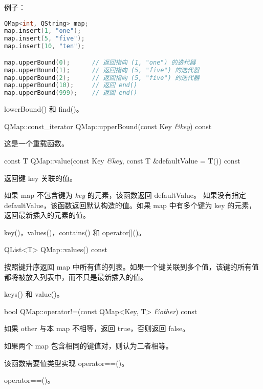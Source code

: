例子：

\begin{lstlisting}[language=C++]
QMap<int, QString> map;
map.insert(1, "one");
map.insert(5, "five");
map.insert(10, "ten");

map.upperBound(0);      // 返回指向 (1, "one") 的迭代器
map.upperBound(1);      // 返回指向 (5, "five") 的迭代器
map.upperBound(2);      // 返回指向 (5, "five") 的迭代器
map.upperBound(10);     // 返回 end()
map.upperBound(999);    // 返回 end()
\end{lstlisting}

\begin{seeAlso}
lowerBound() 和 find()。
\end{seeAlso}

QMap::const\_iterator QMap::upperBound(const Key \emph{\&key}) const

这是一个重载函数。

\splitLine

const T QMap::value(const Key \emph{\&key}, const T \&defaultValue = T()) const

返回键 key 关联的值。

如果 map 不包含键为 \emph{key} 的元素，该函数返回 defaultValue。 如果没有指定 defaultValue，该函数返回默认构造的值。如果 map 中有多个键为 key 的元素，返回最新插入的元素的值。

\begin{seeAlso}
key()，values()，contains() 和 operator[]()。
\end{seeAlso}

\splitLine

QList<T> QMap::values() const

按照键升序返回 map 中所有值的列表。如果一个键关联到多个值，该键的所有值都将被放入列表中，而不只是最新插入的值。

\begin{seeAlso}
keys() 和 value()。
\end{seeAlso}

\splitLine

bool QMap::operator!=(const QMap<Key, T> \emph{\&other}) const

如果 other 与本 map 不相等，返回 true，否则返回 false。

如果两个 map 包含相同的键值对，则认为二者相等。

该函数需要值类型实现 operator==()。

\begin{seeAlso}
operator==()。
\end{seeAlso}

